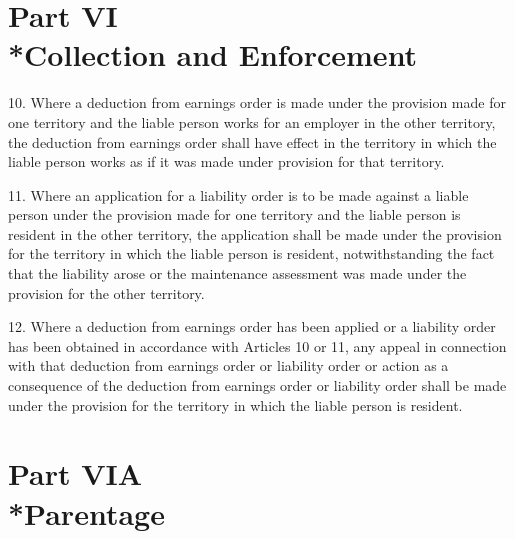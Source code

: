 \documentclass[12pt,a4paper]{article}
\begin{document}
\section[Part VI --- Collection and Enforcement]{Part VI\\*Collection and Enforcement}

\renewcommand\parthead{--- Schedule 1 Part VI}

10.   Where a deduction from earnings order is made under the provision made for one territory and the liable person works for an employer in the other territory, the deduction from earnings order shall have effect in the territory in which the liable person works as if it was made under provision for that territory.

\medskip

11.   Where an application for a liability order is to be made against a liable person under the provision made for one territory and the liable person is resident in the other territory, the application shall be made under the provision for the territory in which the liable person is resident, notwithstanding the fact that the liability arose or the maintenance assessment was made under the provision for the other territory.

\medskip

12.   Where a deduction from earnings order has been applied or a liability order has been obtained in accordance with Articles 10 or 11, any appeal in connection with that deduction from earnings order or liability order or action as a consequence of the deduction from earnings order or liability order shall be made under the provision for the territory in which the liable person is resident.

\section[Part VIA --- Parentage]{Part VIA\\*Parentage}

\renewcommand\parthead{--- Schedule 1 Part VIA}
\end{document}
